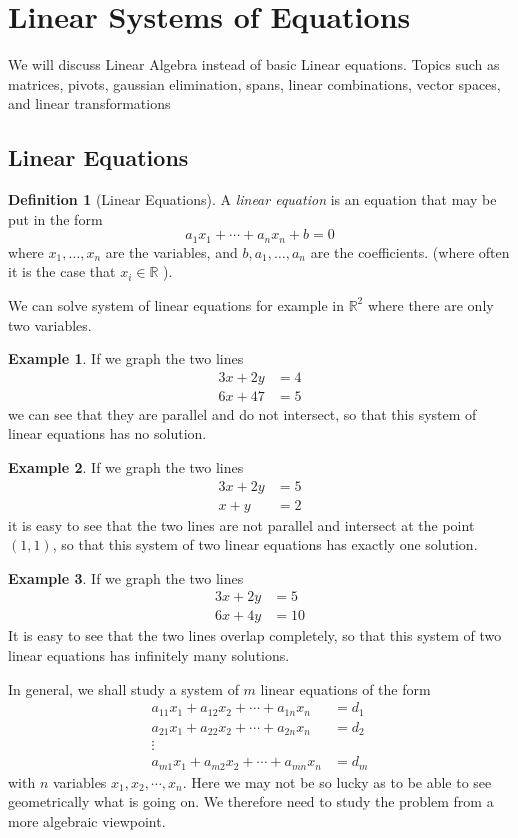 \documentclass[a4paper]{article}
\theoremstyle{definition}
\newtheorem*{defi}{Definition}
\newtheorem*{eg}{Example}
\begin{document}
\newpage
\section{Linear Systems of Equations}
We will discuss Linear Algebra instead of basic Linear equations. Topics
such as matrices, pivots, gaussian elimination, spans, linear combinations,
 vector spaces, and linear transformations
\subsection{Linear Equations}
\begin{defi}[Linear Equations]
      A \emph{linear equation} is an equation that may be put in the form 
      \begin{equation*}
           a_1x_1+\cdots+a_nx_n+b=0
      \end{equation*}
      where $x_1, \ldots ,x_n$ are the variables, and $b,a_1,\ldots,a_n$ are the
      coefficients. (where often it is the case that $x_i \in \mathbb{R} $ ).
\end{defi}
We can solve system of linear equations for example in $\mathbb{R}^2$ where
there are only two variables.
\begin{eg}
      If we graph the two lines 
      \begin{align*}
           3x+2y&=4 \\[1.25ex]
           6x+47 &= 5
      \end{align*}
      we can see that they are parallel and do not intersect, so that 
      this system of linear equations has no solution.
\end{eg}
\begin{eg}
     If we graph the two lines 
     \begin{align*}
          3x+2y&=5 \\[1.25ex]
          x+y &= 2
     \end{align*}
     it is easy to see that the two lines are not parallel and intersect at the
point $(1, 1)$, so that this system of two linear equations has exactly one
solution.
\end{eg}
\begin{eg}
     If we graph the two lines 
     \begin{align*}
          3x+2y &=5 \\[1.25ex]
          6x+4y &=10
     \end{align*}
     It is easy to see that the two lines overlap completely, so that this
system of two linear equations has infinitely many solutions.
\end{eg}
In general, we shall study a system of $m$ linear equations of the form
\begin{align*}
     a_{11}x_1 + a_{12}x_2 + \cdots + a_{1n}x_n &= d_1\\
     a_{21}x_1 + a_{22}x_2 + \cdots + a_{2n}x_n &= d_2\\
     \vdots&\\
     a_{m1}x_1 + a_{m2}x_2 + \cdots + a_{mn}x_n &= d_m
   \end{align*}
with $n$ variables $x_1,x_2,\cdots,x_n$. Here we may not be so lucky as to be
able to see geometrically what is going on. We therefore need to study the
problem from a more algebraic viewpoint.
\end{document}
